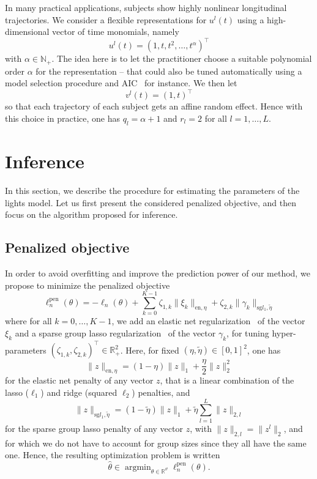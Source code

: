 \documentclass[11pt]{article}
\DeclareMathOperator{\argmin}{argmin}
\newcommand{\norm}[1]{\|#1\|}
\newcommand{\R}{\mathds R}
\newcommand{\N}{\mathds N}
\begin{document}
In many practical applications, subjects show highly nonlinear longitudinal trajectories. We consider a flexible representations for $u^l(t)$ using a high-dimensional vector of time monomials, namely 
\begin{equation}
  \label{eq:alpha-def}
  u^l(t) = (1, t, t^2, \ldots, t^\alpha)^\top
\end{equation}
with $\alpha \in \N_+$.
The idea here is to let the practitioner choose a suitable polynomial order $\alpha$ for the representation -- that could also be tuned automatically using a model selection procedure and AIC~\citep{akaike1974new} for instance.
We then let \[v^l(t) = (1, t)^\top\] so that each trajectory of each subject gets an affine random effect. Hence with this choice in practice, one has $q_l=\alpha + 1$ and $r_l=2$ for all $l=1, \ldots, L$.

\section{Inference}
\label{sec:inference}

In this section, we describe the procedure for estimating the parameters of the lights model. Let us first present the considered penalized objective, and then focus on the algorithm proposed for inference.

\subsection{Penalized objective}
\label{sec:penalized-obj}

In order to avoid overfitting and improve the prediction power of our method, we propose to minimize the penalized objective
\begin{equation}
  \label{eq:pen-log-lik}
	\ell_n^\text{pen}(\theta) = - \ell_n(\theta) + \sum_{k=0}^{K-1} \zeta_{1,k} \norm{\xi_k}_{\text{en}, \eta} + \zeta_{2,k} \norm{\gamma_k}_{\text{sg} l_1, \tilde{\eta}}
\end{equation}
where for all $k=0, \ldots, K-1$, we add an elastic net regularization~\citep{zou2005regularization} of the vector $\xi_k$ and a sparse group lasso regularization~\citep{simon2013sparse} of the vector $\gamma_k$, for tuning hyper-parameters $(\zeta_{1,k}, \zeta_{2,k})^\top \in \R_+^2$. Here, for fixed $(\eta, \tilde{\eta}) \in [0, 1]^2$, one has
\[ \norm{z}_{\text{en}, \eta} = (1-\eta)\norm{z}_1 + \dfrac\eta2 \norm{z}_2^2 \]
for the elastic net penalty of any vector $z$, that is a linear combination of the lasso ($\ell_1$) and ridge (squared $\ell_2$) penalties, and
\[ \norm{z}_{\text{sg} l_1, \tilde{\eta}} = (1-\tilde{\eta})\norm{z}_1 + \tilde{\eta} \sum_{l=1}^L\norm{z}_{2,l} \] for the sparse group lasso penalty of any vector $z$, with $\norm{z}_{2,l}=\norm{z^l}_2$, and for which we do not have to account for group sizes since they all have the same one. 
Hence, the resulting optimization problem is written
\begin{equation}
  \label{eq:optim-pb}
   \hat \theta \in \argmin_{\theta \in \R^\vartheta} \ell_n^\text{pen}(\theta).
 \end{equation}
\end{document}
